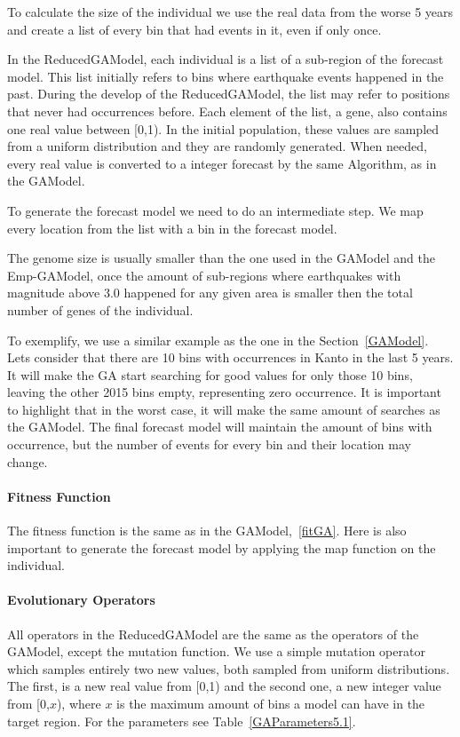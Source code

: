 To calculate the size of the individual we use the real data from the worse 5 years and create a list of every bin that had events in it, even if only once.

In the ReducedGAModel, each individual is a list of a sub-region of the forecast model. This list initially refers to bins where earthquake events happened in the past. During the develop of the ReducedGAModel, the list may refer to positions that never had occurrences before. Each element of the list, a gene, also contains one real value between [0,1). In the initial population, these values are sampled from a uniform distribution and they are randomly generated. When needed, every real value is converted to a integer forecast by the same Algorithm, as in the GAModel.

To generate the forecast model we need to do an intermediate step. We map every location from the list with a bin in the forecast model.

The genome size is usually smaller than the one used in the GAModel and the Emp-GAModel, once the amount of sub-regions where earthquakes with magnitude above 3.0 happened for any given area is smaller then the total number of genes of the individual.

To exemplify, we use a similar example as the one in the Section~\ref{GAModel}. Lets consider that there are 10 bins with occurrences in Kanto in the last 5 years. It will make the GA start searching for good values for only those 10 bins, leaving the other 2015 bins empty, representing zero occurrence. It is important to highlight that in the worst case, it will make the same amount of searches as the GAModel. The final forecast model will maintain the amount of bins with occurrence, but the number of events for every bin and their location may change.

\paragraph{Fitness Function}
The fitness function is the same as in the GAModel,~\ref{fitGA}. Here is also important to generate the forecast model by applying the map function on the individual.

\paragraph{Evolutionary Operators}\label{ReducedOperators}
All operators in the ReducedGAModel are the same as the operators of the GAModel, except the mutation function. We use a simple mutation operator which samples entirely two new values, both sampled from uniform distributions. The first, is a new real value from [0,1) and the second one, a new integer value from [0,$x$), where $x$ is the maximum amount of bins a model can have in the target region. For the parameters see Table~\ref{GAParameters5.1}.

